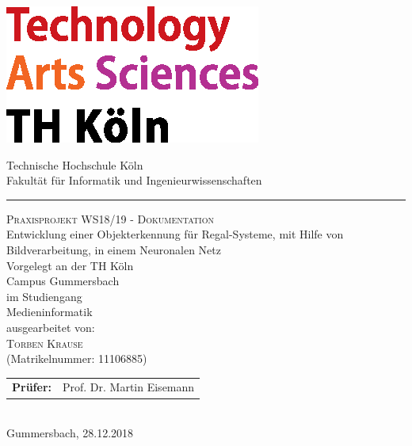 \documentclass[a4paper,12pt,oneside]{article}
\begin{document}
  
  \pagestyle{empty}
  \begin{titlepage}
    \includegraphics[scale=1.00]{Sources/logo_TH-Koeln_CMYK_22pt}\\
    \begin{center}
      \Large
      Technische Hochschule Köln\\
      Fakultät für Informatik und Ingenieurwissenschaften\\
      \hrule\par\rule{0pt}{2cm} %
      \LARGE
      \textsc{Praxisprojekt WS18/19 - Dokumentation}\\
      \vspace{1cm} %
      \huge
      Entwicklung einer Objekterkennung für Regal-Systeme,
      mit Hilfe von Bildverarbeitung, in einem Neuronalen Netz\\
      \vspace{1 cm}
      \large
      Vorgelegt an der TH Köln\\
      Campus Gummersbach\\
      im Studiengang\\
      Medieninformatik\\ 
      \vspace{1.0cm}
      ausgearbeitet von:\\
      \textsc{Torben Krause}\\
      (Matrikelnummer: 11106885)\\
      \vspace{1.5cm}
      \begin{tabular}{ll} %
          \textbf{Prüfer:} & Prof. Dr. Martin Eisemann \\
      \end{tabular}
      \vspace{1.5cm}
      \\Gummersbach, 28.12.2018
    \end{center}    
  \end{titlepage}
  
\end{document}
